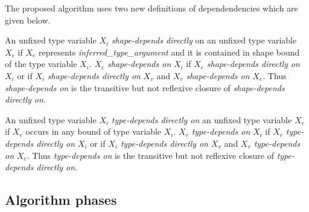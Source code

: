 The proposed algorithm uses two new definitions of dependendencies which are given below.
\begin{defn}
An unfixed type variable \texttt{$X_i$} \emph{shape-depends directly} on an unfixed type variable \texttt{$X_e$} if \texttt{$X_e$} represents \textit{inferred\_type\_argument} and it is contained in shape bound of the type variable \texttt{$X_i$}.
\texttt{$X_e$} \textit{shape-depends on} \texttt{$X_i$} if \texttt{$X_e$} \textit{shape-depends directly on} \texttt{$X_i$} or if \texttt{$X_i$} \textit{shape-depends directly on} \texttt{$X_v$} and \texttt{$X_v$} \textit{shape-depends on} \texttt{$X_e$}. Thus \textit{shape-depends on} is the transitive but not reflexive closure of \textit{shape-depends directly on}.
\end{defn}
\begin{defn}
An unfixed type variable \texttt{$X_i$} \textit{type-depends directly on} an unfixed type variable \texttt{$X_e$} if \texttt{$X_e$} occurs in any bound of type variable \texttt{$X_i$}.
\texttt{$X_e$} \textit{type-depends on} \texttt{$X_i$} if \texttt{$X_e$} \textit{type-depends directly on} \texttt{$X_i$} or if \texttt{$X_i$} \textit{type-depends directly on} \texttt{$X_v$} and \texttt{$X_v$} \textit{type-depends on} \texttt{$X_e$}. 
Thus \textit{type-depends on} is the transitive but not reflexive closure of \textit{type-depends directly on}.
\end{defn}

\subsection{Algorithm phases}

